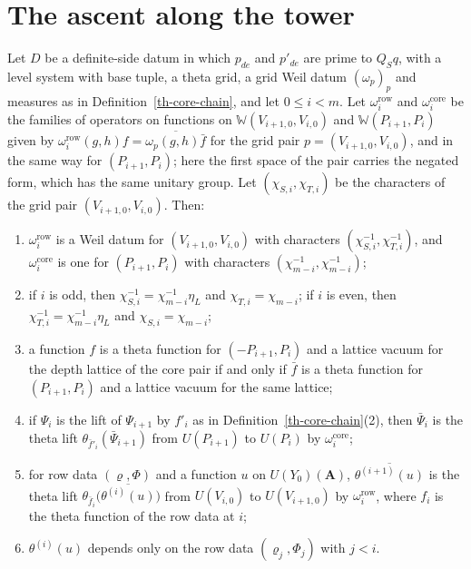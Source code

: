 \section{The ascent along the tower}\label{section-th-ascent}

\begin{lemma}\label{th-grid-conjugation}
Let $D$ be a definite-side datum in which $p_{de}$ and $p'_{de}$ are prime to
$Q_Sq$, with a level system with base tuple, a theta grid, a grid Weil datum
$(\omega_p)_p$ and measures as in Definition~\ref{th-core-chain}, and let
$0\leq i<m$. Let $\omega^{\mathrm{row}}_i$ and $\omega^{\mathrm{core}}_i$ be the
families of operators on functions on $\mathbb W(V_{i+1,0},V_{i,0})$ and
$\mathbb W(P_{i+1},P_i)$ given by
$\omega^{\mathrm{row}}_i(g,h)f=\overline{\omega_p(g,h)\bar f}$ for the grid pair
$p=(V_{i+1,0},V_{i,0})$, and in the same way for $(P_{i+1},P_i)$; here the
first space of the pair carries the negated form, which has the same unitary
group. Let $(\chi_{S,i},\chi_{T,i})$ be the characters of the grid pair
$(V_{i+1,0},V_{i,0})$. Then:
\begin{enumerate}
\item $\omega^{\mathrm{row}}_i$ is a Weil datum for $(V_{i+1,0},V_{i,0})$ with
  characters $(\chi_{S,i}^{-1},\chi_{T,i}^{-1})$, and $\omega^{\mathrm{core}}_i$
  is one for $(P_{i+1},P_i)$ with characters
  $(\chi_{m-i}^{-1},\chi_{m-i}^{-1})$;
\item if $i$ is odd, then $\chi_{S,i}^{-1}=\chi_{m-i}^{-1}\eta_L$ and
  $\chi_{T,i}=\chi_{m-i}$; if $i$ is even, then
  $\chi_{T,i}^{-1}=\chi_{m-i}^{-1}\eta_L$ and $\chi_{S,i}=\chi_{m-i}$;
\item a function $f$ is a theta function for $(-P_{i+1},P_i)$ and a lattice
  vacuum for the depth lattice of the core pair if and only if $\bar f$ is a
  theta function for $(P_{i+1},P_i)$ and a lattice vacuum for the same lattice;
\item if $\Psi_i$ is the lift of $\Psi_{i+1}$ by $f'_i$ as in
  Definition~\ref{th-core-chain}(2), then $\bar\Psi_i$ is the theta lift
  $\theta_{\bar f'_i}(\bar\Psi_{i+1})$ from $U(P_{i+1})$ to $U(P_i)$ by
  $\omega^{\mathrm{core}}_i$;
\item for row data $(\varrho,\Phi)$ and a function $u$ on $U(Y_0)(\mathbf A)$,
  $\overline{\theta^{(i+1)}(u)}$ is the theta lift
  $\theta_{\bar f_i}\bigl(\overline{\theta^{(i)}(u)}\bigr)$ from $U(V_{i,0})$ to
  $U(V_{i+1,0})$ by $\omega^{\mathrm{row}}_i$, where $f_i$ is the theta function
  of the row data at $i$;
\item $\theta^{(i)}(u)$ depends only on the row data $(\varrho_j,\Phi_j)$ with
  $j<i$.
\end{enumerate}
\end{lemma}
